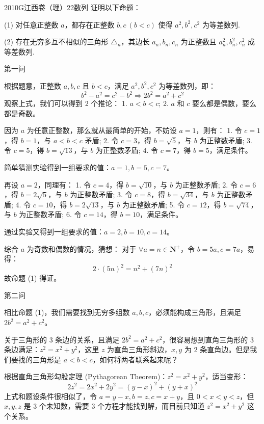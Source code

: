 
\begin{problem}{2010}{G}{江西卷（理）}{22}{数列}
证明以下命题：

(1) 对任意正整数 $a$，都存在正整数 $b,c\ (b<c)$ 使得 $a^2, b^2, c^2$ 为等差数列.

(2) 存在无穷多互不相似的三角形 $\triangle_n$，其边长 $a_n, b_n, c_n$ 为正整数且 $a_n^2, b_n^2, c_n^2$ 成等差数列.
\end{problem}

\begin{solutions}
第一问

根据题意，正整数 $a,b,c$ 且 $b<c$，满足 $a^2, b^2, c^2$ 为等差数列，即：
$$
b^2-a^2=c^2-b^2 \Rightarrow 2b^2=a^2+c^2
$$
观察上式，我们可以得到 2 个推论：
1. $a<b<c$;
2. $a$ 和 $c$ 要么都是偶数，要么都是奇数。

因为 $a$ 为任意正整数，那么就从最简单的开始，不妨设 $a=1$，则有：
1. 令 $c=1$，得 $b=1$，与 $a<b<c$ 矛盾;
2. 令 $c=3$，得 $b=\sqrt{5}$，与 $b$ 为正整数矛盾;
3. 令 $c=5$，得 $b=\sqrt{13}$，与 $b$ 为正整数矛盾;
4. 令 $c=7$，得 $b=5$，满足条件。

简单猜测实验得到一组要求的值：$a=1, b=5, c=7$。

再设 $a=2$，同理有：
1. 令 $c=4$，得 $b=\sqrt{10}$，与 $b$ 为正整数矛盾;
2. 令 $c=6$，得 $b=2\sqrt{5}$，与 $b$ 为正整数矛盾;
3. 令 $c=8$，得 $b=\sqrt{34}$，与 $b$ 为正整数矛盾;
4. 令 $c=10$，得 $b=2\sqrt{13}$，与 $b$ 为正整数矛盾;
5. 令 $c=12$，得 $b=\sqrt{74}$，与 $b$ 为正整数矛盾;
6. 令 $c=14$，得 $b=10$，满足条件。

通过实验又得到一组要求的值：$a=2, b=10, c=14$。

综合 $a$ 为奇数和偶数的情况，猜想：
对于 $\forall a=n\in \mathbf{N}^+$，令 $b=5a, c=7a$，易得：
$$
2\cdot (5n)^2=n^2+(7n)^2
$$
故命题 (1) 得证。

第二问

相比命题 (1)，我们需要找到无穷多组数 $a,b,c$，必须能构成三角形，且满足 $2b^2=a^2+c^2$。

关于三角形的 3 条边的关系，且满足 $2b^2=a^2+c^2$，很容易想到直角三角形的 3 条边满足：$z^2=x^2+y^2$，这里 $z$ 为直角三角形斜边，$x,y$ 为 2 条直角边。但是我们要找的三角形是 $a<b<c$，如何将两者联系起来呢？

根据直角三角形勾股定理 (Pythagorean Theorem)：$z^2=x^2+y^2$，适当变形：
$$
2z^2=2x^2+2y^2=(y-x)^2+(y+x)^2
$$
上式和题设条件很相似了，令 $a=y-x, b=z, c=x+y$，且 $0<x<y<z$，但 $x,y,z$ 是 3 个未知数，需要 3 个方程才能找到解，而目前只知道 $z^2=x^2+y^2$ 这个关系。


\end{solutions}
